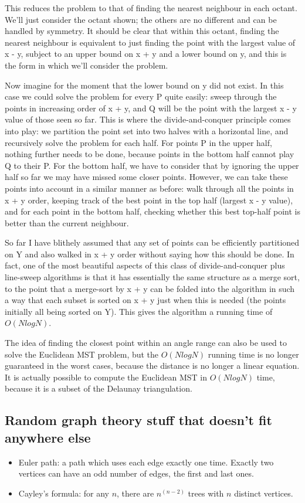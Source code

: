 \documentclass[a4paper,12pt]{article}
\begin{document}
This reduces the problem to that of finding the nearest neighbour in each octant. We'll just 
consider the octant shown; the others are no different and can be handled by symmetry. It 
should be clear that within this octant, finding the nearest neighbour is equivalent to just 
finding the point with the largest value of x - y, subject to an upper bound on x + y and a 
lower bound on y, and this is the form in which we'll consider the problem.

Now imagine for the moment that the lower bound on y did not exist. In this case we could 
solve the problem for every P quite easily: sweep through the points in increasing order of 
x + y, and Q will be the point with the largest x - y value of those seen so far. This is 
where the divide-and-conquer principle comes into play: we partition the point set into two 
halves with a horizontal line, and recursively solve the problem for each half. For points P 
in the upper half, nothing further needs to be done, because points in the bottom half 
cannot play Q to their P. For the bottom half, we have to consider that by ignoring the 
upper half so far we may have missed some closer points. However, we can take these points 
into account in a similar manner as before: walk through all the points in x + y order, 
keeping track of the best point in the top half (largest x - y value), and for each point in 
the bottom half, checking whether this best top-half point is better than the current 
neighbour.

So far I have blithely assumed that any set of points can be efficiently partitioned on Y 
and also walked in x + y order without saying how this should be done. In fact, one of the 
most beautiful aspects of this class of divide-and-conquer plus line-sweep algorithms is 
that it has essentially the same structure as a merge sort, to the point that a merge-sort 
by x + y can be folded into the algorithm in such a way that each subset is sorted on x + y 
just when this is needed (the points initially all being sorted on Y). This gives the 
algorithm a running time of $O(N log N)$.

The idea of finding the closest point within an angle range can also be used to solve the 
Euclidean MST problem, but the $O(N log N)$ running time is no longer guaranteed in the worst 
cases, because the distance is no longer a linear equation. It is actually possible to 
compute the Euclidean MST in $O(N log N)$ time, because it is a subset of the Delaunay 
triangulation.

\subsection{Random graph theory stuff that doesn't fit anywhere else}
\begin{itemize}\item Euler path: a path which uses each edge exactly one time. Exactly two vertices can have an odd number of edges, the first and last ones.
\item Cayley's formula: for any $n$, there are $n^{(n-2)}$ trees with $n$ distinct vertices.
\end{itemize}
\end{document}
